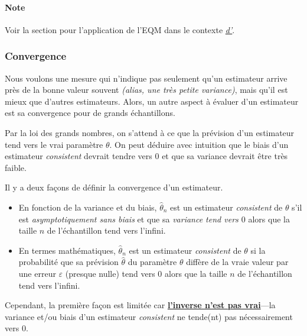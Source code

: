 \documentclass[french]{article}
\begin{document}
\begin{multicols*}{2}
\paragraph{Note}	Voir la section \textit{\underline{}} pour l'application de l'EQM dans le contexte \textit{\underline{d'}}.


\columnbreak
\subsubsection{Convergence}\label{subsubsec:ConsistencyEstim}
\begin{rappel_enhanced}[Motivation]
Nous voulons une mesure qui n'indique pas seulement qu'un estimateur arrive près de la bonne valeur souvent \textit{(alias, une très petite variance)}, mais qu'il est mieux que d'autres estimateurs. Alors, un autre aspect à évaluer d'un estimateur est sa convergence pour de grands échantillons. 

\bigskip

Par la loi des grands nombres, on s'attend à ce que la prévision d'un estimateur tend vers le vrai paramètre $\theta$. On peut déduire avec intuition que le biais d'un estimateur \og \textit{consistent} \fg{} devrait tendre vers $0$ et que sa variance devrait être très faible.
\end{rappel_enhanced}

Il y a deux façons de définir la convergence d'un estimateur. 
\begin{itemize}
	\item	En fonction de la variance et du biais, $\hat{\theta}_{n}$ est un estimateur \og \textit{consistent} \fg{} de $\theta$ s'il est \textit{asymptotiquement sans biais} et que sa \textit{variance tend vers $0$} alors que la taille $n$ de l'échantillon tend vers l'infini.
	\item	En termes mathématiques, $\hat{\theta}_{n}$ est un estimateur \og \textit{consistent} \fg{} de $\theta$ si la probabilité que sa prévision $\hat{\theta}$ du paramètre $\theta$ diffère de la vraie valeur par une erreur $\varepsilon$ (presque nulle) tend vers $0$ alors que la taille $n$ de l'échantillon tend vers l'infini.
\end{itemize}

Cependant, la première façon est limitée car \underline{\textbf{l'inverse n'est pas vrai}}---la variance et/ou biais d'un estimateur \og \textit{consistent} \fg{} ne tende(nt) pas nécessairement vers 0.


\end{multicols*}
\end{document}
